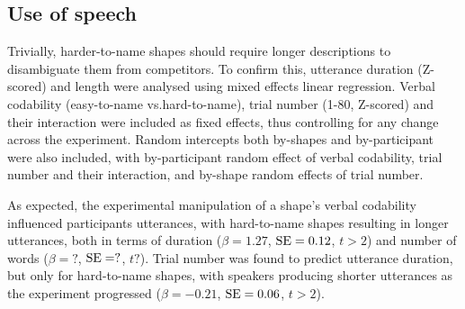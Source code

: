 \documentclass[a4paper,man,natbib]{apa6}
\newcommand{\resultsLM}[3]{$\beta = #1$, $\textnormal{SE} = #2$, $t #3$}
\begin{document}
\subsection{Use of speech}
Trivially, harder-to-name shapes should require longer descriptions to disambiguate them from competitors. 
To confirm this, utterance duration (Z-scored) and length were analysed using mixed effects linear regression.
Verbal codability (easy-to-name vs.\@ hard-to-name), trial number (1-80, Z-scored) and their interaction were included as fixed effects, thus controlling for any change across the experiment.
Random intercepts both by-shapes and by-participant were also included, with by-participant random effect of verbal codability, trial number and their interaction, and by-shape random effects of trial number.

As expected, the experimental manipulation of a shape's verbal codability influenced participants utterances, with hard-to-name shapes resulting in longer utterances, both in terms of duration (\resultsLM{1.27}{0.12}{>2}) and number of words (\resultsLM{?}{?}{?}).
Trial number was found to predict utterance duration, but only for hard-to-name shapes, with speakers producing shorter utterances as the experiment progressed (\resultsLM{-0.21}{0.06}{>2}).
\end{document}
